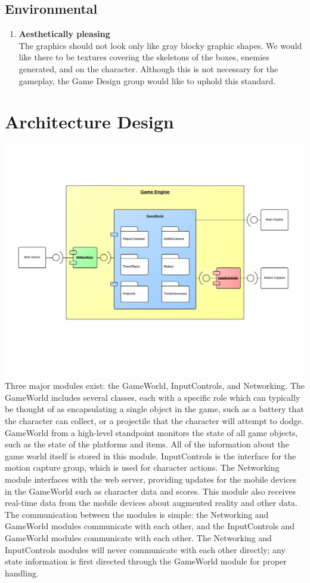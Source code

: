 \documentclass[10pt,letterpaper,oneside,english]{article}
\begin{document}
\subsection{Environmental}
\begin{enumerate}
\item \textbf{Aesthetically pleasing} \\ The graphics should not look only like gray blocky graphic shapes. We would like there to be textures covering the skeletons of the boxes, enemies generated, and on the character. Although this is not necessary for the gameplay, the Game Design group would like to uphold this standard.
\end{enumerate}

\section{Architecture Design}
\includegraphics[scale=.6]{comp}\\
Three major modules exist: the GameWorld, InputControls, and Networking. The GameWorld includes several classes, each with a specific role which can typically be thought of as encapsulating a single object in the game, such as a battery that the character can collect, or a projectile that the character will attempt to dodge. GameWorld from a high-level standpoint monitors the state of all game objects, such as the state of the platforms and items. All of the information about
the game world itself is stored in this module. InputControls is the interface for the motion capture group, which is used for character actions. The Networking module interfaces with the web server, providing updates for the mobile devices in the GameWorld such as character data and scores. This module also receives real-time data from the mobile devices about augmented reality and other data.\\
The communication between the modules is simple: the Networking and GameWorld modules communicate with each other, and the InputControls and GameWorld modules communicate with each other. The Networking and InputControls modules will never communicate with each other directly; any state information is first directed through the GameWorld module for proper handling.
\end{document}
